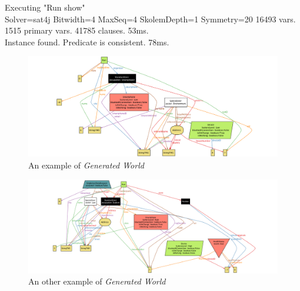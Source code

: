    \vspace{1cm}

   Executing "Run show" \\ \noindent
      Solver=sat4j Bitwidth=4 MaxSeq=4 SkolemDepth=1 Symmetry=20
      16493 vars. 1515 primary vars. 41785 clauses. 53ms. \\ \noindent
      Instance found. Predicate is consistent. 78ms.

   \vspace{1cm}


 \begin{figure}[H]
 \begin{center}
   \includegraphics[width=0.80\paperwidth]{./img/alloy/alloy3.png}
   \hspace{0.05\linewidth}
   \centering
   \caption{An example of \textit{Generated World}}
   \label{img:generatedWorld}
 \end{center}
 \end{figure}

 \begin{figure}[H]
 \begin{center}
   \includegraphics[width=0.80\paperwidth]{./img/alloy/alloy5.png}
   \hspace{0.05\linewidth}
   \centering
   \caption{An other example of \textit{Generated World}}
   \label{img:generatedWorld}
 \end{center}
 \end{figure}

